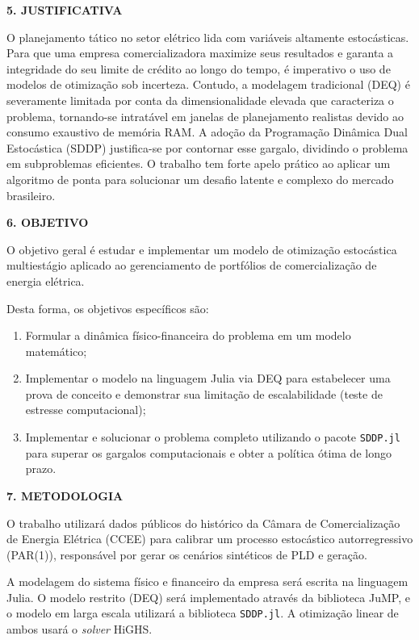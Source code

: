 \documentclass[a4paper,12pt,oneside,openany]{report}
\begin{document}
\vspace{0.4cm}
\textbf{5. JUSTIFICATIVA}

O planejamento tático no setor elétrico lida com variáveis altamente estocásticas. Para que uma empresa comercializadora maximize seus resultados e garanta a integridade do seu limite de crédito ao longo do tempo, é imperativo o uso de modelos de otimização sob incerteza. Contudo, a modelagem tradicional (DEQ) é severamente limitada por conta da dimensionalidade elevada que caracteriza o problema, tornando-se intratável em janelas de planejamento realistas devido ao consumo exaustivo de memória RAM. A adoção da Programação Dinâmica Dual Estocástica (SDDP) justifica-se por contornar esse gargalo, dividindo o problema em subproblemas eficientes. O trabalho tem forte apelo prático ao aplicar um algoritmo de ponta para solucionar um desafio latente e complexo do mercado brasileiro.

\vspace{0.4cm}
\textbf{6. OBJETIVO}

O objetivo geral é estudar e implementar um modelo de otimização estocástica multiestágio aplicado ao gerenciamento de portfólios de comercialização de energia elétrica.

Desta forma, os objetivos específicos são: 
\begin{enumerate}[(1)]
    \item Formular a dinâmica físico-financeira do problema em um modelo matemático;
    \item Implementar o modelo na linguagem Julia via DEQ para estabelecer uma prova de conceito e demonstrar sua limitação de escalabilidade (teste de estresse computacional);
    \item Implementar e solucionar o problema completo utilizando o pacote \texttt{SDDP.jl} para superar os gargalos computacionais e obter a política ótima de longo prazo.
\end{enumerate}

\vspace{0.4cm}
\textbf{7. METODOLOGIA}

O trabalho utilizará dados públicos do histórico da Câmara de Comercialização de Energia Elétrica (CCEE) para calibrar um processo estocástico autorregressivo (PAR(1)), responsável por gerar os cenários sintéticos de PLD e geração.

A modelagem do sistema físico e financeiro da empresa será escrita na linguagem Julia. O modelo restrito (DEQ) será implementado através da biblioteca JuMP, e o modelo em larga escala utilizará a biblioteca \texttt{SDDP.jl}. A otimização linear de ambos usará o \textit{solver} HiGHS.
\end{document}
